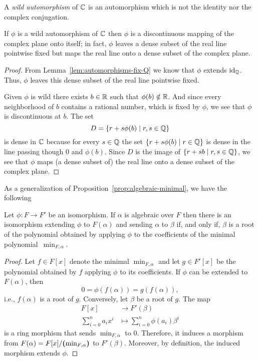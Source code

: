 \begin{defn}
    A \textsl{wild automorphism} of $\mathbb{C}$ is an automorphism which is not the identity nor the complex conjugation.
\end{defn}

\begin{thm}
    If $\phi$ is a wild automorphism of $\mathbb{C}$ then $\phi$ is a discontinuous mapping of the complex plane onto itself; in fact, $\phi$ leaves a dense subset of the real line pointwise fixed but maps the real line onto a dense subset of the complex plane.
\end{thm}

\begin{proof}
    From Lemma~\ref{lem:automorphisms-fix-Q} we know that $\phi$ extends $\operatorname{id}_{\mathbb{Q}}$. Thus, $\phi$ leaves this dense subset of the real line pointwise fixed.

    Given $\phi$ is wild there exists $b\in\mathbb{R}$ such that $\phi(b)\notin\mathbb{R}$. And since every neighborhood of $b$ contains a rational number, which is fixed by $\phi$, we see that $\phi$ is discontinuous at $b$. The set
    $$
        D = \{r+s\phi(b)\mid r,s\in\mathbb{Q}\}
    $$
    is dense in $\mathbb{C}$ because for every $s\in\mathbb{Q}$ the set $\{r+s\phi(b)\mid r\in\mathbb{Q}\}$ is dense in the line passing though $0$ and $\phi(b)$. Since $D$ is the image of $\{r+sb\mid r,s\in\mathbb{Q}\}$, we see that $\phi$ maps (a dense subset of) the real line onto a dense subset of the complex plane.
\end{proof}

As a generalization of Proposition~\ref{prop:algebraic-minimal}, we have the following

\begin{prop}\label{prop:algebraic-extension-morphism}
    Let\/ $\phi\colon F\to F'$ be an isomorphism. If\/ $\alpha$ is algebraic over\/ $F$ then there is an isomorphism extending\/ $\phi$ to\/ $F(\alpha)$ and sending\/ $\alpha$ to\/ $\beta$ if, and only if, $\beta$ is a root of the polynomial obtained by applying\/ $\phi$ to the coefficients of the minimal polynomial\/~$\min_{F,\alpha}$.
\end{prop}

\begin{proof}
    Let $f\in F[x]$ denote the minimal $\min_{F,\alpha}$ and let $g\in F'[x]$ be the polynomial obtained by $f$ applying $\phi$ to its coefficients. If $\phi$ can be extended to $F(\alpha)$, then
    $$
        0=\phi(f(\alpha)) = g(f(\alpha)),
    $$
    i.e., $f(\alpha)$ is a root of $g$. Conversely, let $\beta$ be a root of $g$. The map
    \begin{align*}
        F[x]&\to F'(\beta)\\
        \sum_{i=0}^na_ix^i&\mapsto\sum_{i=0}^n\phi(a_i)\beta^i
    \end{align*}
    is a ring morphism that sends $\min_{F,\alpha}$ to $0$. Therefore, it induces a morphism from $F(\alpha)=F[x]/\textrm{\boldmath$($}\!\min_{F,\alpha}\!\textrm{\boldmath$)$}$ to $F'(\beta)$. Moreover, by definition, the induced morphism extends $\phi$.
\end{proof}

